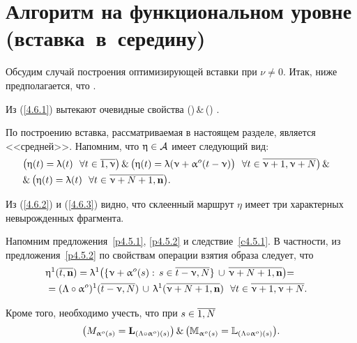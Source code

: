 
\section{
  Алгоритм на функциональном уровне
  (вставка~в~середину)
}
\label{sect:4.6}
\setcounter{equation}{0}

Обсудим случай построения оптимизирующей вставки при
$\nu \neq 0$.
Итак, ниже предполагается, что
\bfn
  \label{4.6.1}
  \nu\in {}
  .
\efn

Из (\ref{4.6.1}) вытекают очевидные свойства
\bfn
  \label{4.6.2}
  (\neq \emp)\,\&\,(\neq \emp)
  .
\efn

По построению вставка, рассматриваемая в настоящем разделе, является <<средней>>.
Напомним, что $\upeta\in {\cal A}$ имеет следующий вид:
\begin{eqnarray}
  &\bigl(\eta(t) = \la(t)\ \ \fa t\in \ov{1,\nu}\bigl)\,\&\,\bigl(\eta(t) =
  \la(\nu+ \al^o(t-\nu)\bigl)\ \ \fa t\in \ov{\nu+1,\nu+N}\bigl)\,\&
  &\nonumber\\
  &\&\,\bigl(\eta(t)= \la(t)\ \ \fa t\in \ov{\nu+N+1,\mathbf{n}}\bigl)
  .
  &
  \label{4.6.3}
\end{eqnarray}

Из (\ref{4.6.2}) и (\ref{4.6.3}) видно,
что склеенный маршрут $\eta$
имеет три характерных невырожденных фрагмента.

Напомним предложения~\ref{p4.5.1}, \ref{p4.5.2} и следствие~\ref{c4.5.1}.
В частности,
из предложения~\ref{p4.5.2}
по свойствам операции взятия образа следует, что
\begin{eqnarray}
  &\eta^1(\ov{t,\mathbf{n}}) = \la^1\bigl(\{\nu+\al^o(s):\,s\in \ov{t-\nu,N}\}\,\cup\,
  \ov{\nu+N+1,\nn}\bigl) =
  &\nonumber\\
  &= (\La \circ\al^o)^1(\ov{t-\nu,N})\,\cup\, \la^1(\ov{\nu+N+1,\nn})\ \ \fa t\in \ov{\nu+1,\nu+N}
  .
  &
  \label{4.6.3`}
\end{eqnarray}

Кроме того,
необходимо учесть,
что при
$s\in \ov{1,N}$
$$
  \bigl(M_{\upalpha^o(s)} = \mathbf{L}_{(\Lambda\circ \upalpha^o)(s)}\bigl)\,\&\,\bigl({\mathbb M}_{\upalpha^o(s)} =
  {\mathbb L}_{(\Lambda\circ \upalpha^o)(s)}\bigl)
  .
$$

